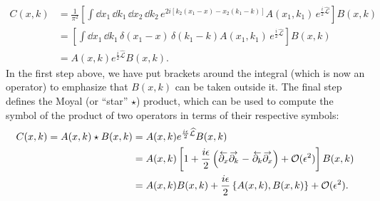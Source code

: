 %
\begin{equation}
  \begin{aligned}
    C(x, k) &= \frac{1}{\pi^{2}} \left[\int \dd{x_{1}}\, \dd{k_{1}}\, \dd{x_{2}}\, \dd{k_{2}}\,e^{2i[k_{2}(x_{1} - x) - x_{2}(k_{1} - k)]} A(x_{1}, k_{1})\, e^{\frac{i}{2}\widehat{\mathcal{L}}}\right] B(x, k)\\
                     &= \left[\int \dd{x_{1}}\, \dd{k_{1}}\, \delta(x_{1} - x)\,\delta(k_{1} - k) A(x_{1}, k_{1})\, e^{\frac{i}{2}\widehat{\mathcal{L}}}\right] B(x, k)\\
                     &= A(x, k)e^{\frac{i}{2}\widehat{\mathcal{L}}} B(x, k).
  \end{aligned}
\end{equation}
%
In the first step above, we have put brackets around the integral (which is now an operator) to emphasize that $B(x, k)$ can be taken outside it.
The final step defines the Moyal (or ``star'' $\star$) product, which can be used to compute the symbol of the product of two operators in terms of their respective symbols:
%
\begin{equation}
  \begin{aligned}
    C(x, k) = A(x, k)\star B(x, k) &= A(x, k)e^{\frac{i\epsilon}{2}\widehat{\mathcal{L}}} B(x, k)\\
                                                             &= A(x, k)\left[1 + \frac{i\epsilon}{2}\left(\ogets{\partial_{x}}\oto{\partial_{k}} - \ogets{\partial_{k}}\oto{\partial_{x}}\right) + \mathcal{O}(\epsilon^{2}) \right] B(x, k)\\
                                                             &= A(x, k)B(x, k) + \frac{i\epsilon}{2}\left\{A(x, k), B(x, k)\right\} + \mathcal{O}(\epsilon^{2}).
  \end{aligned}
\end{equation}
